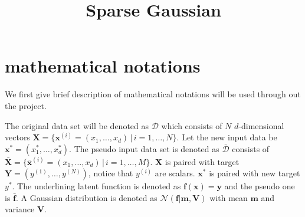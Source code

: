 \documentclass[10pt,a4paper]{article}
\title{Sparse Gaussian}
\begin{document}
\maketitle
\section{mathematical notations}
We first give brief description of mathematical notations will be used through out the project. 

The original data set will be denoted as $\mathcal{D}$ which consists of $N$ $d$-dimensional vectors $\pmb{X}=\lbrace\pmb{x}^{(i)}=(x_1,\dots,x_d)\,|\, i=1,\dots,N\rbrace$. Let the new input data be $\pmb{x}^{*}=(x^*_1,\dots,x^*_d)$. The pseudo input data set is denoted as $\bar{\mathcal{D}}$ consists of $\bar{\pmb{X}}=\lbrace\pmb{\bar{x}}^{(i)}=(x_1,\dots,x_d)\,|\,i=1,\dots,M\rbrace$. $\pmb{X}$ is paired with target $\pmb{Y}=(y^{(1)},\dots,y^{(N)})$, notice that $y^{(i)}$ are scalars. $\pmb{x}^*$ is paired with new target $y^*$. The underlining latent function is denoted as $\pmb{f}(\pmb{x})=\pmb{y}$ and the pseudo one is $\bar{\pmb{f}}$. A Gaussian distribution is denoted as $\mathcal{N}(\pmb{f}|\pmb{m},\pmb{V})$ with mean $\pmb{m}$ and variance $\pmb{V}$.
\end{document}
